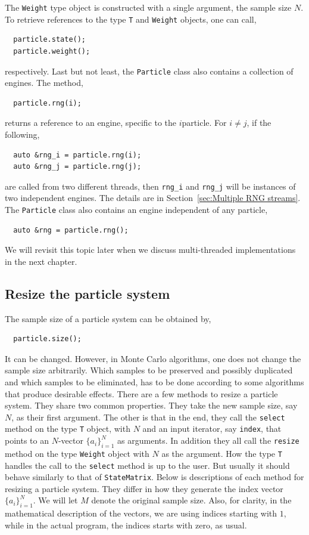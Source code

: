 The \verb|Weight| type object is constructed with a single argument, the sample
size $N$. To retrieve references to the type \verb|T| and \verb|Weight|
objects, one can call,
\begin{Verbatim}
  particle.state();
  particle.weight();
\end{Verbatim}
respectively. Last but not least, the \verb|Particle| class also contains a
collection of \rng engines. The method,
\begin{Verbatim}
  particle.rng(i);
\end{Verbatim}
returns a reference to an \rng engine, specific to the $i$\ith particle. For $i
\ne j$, if the following,
\begin{Verbatim}
  auto &rng_i = particle.rng(i);
  auto &rng_j = particle.rng(j);
\end{Verbatim}
are called from two different threads, then \verb|rng_i| and \verb|rng_j| will
be instances of two independent \rng engines. The details are in
Section~\ref{sec:Multiple RNG streams}. The \verb|Particle| class also contains
an \rng engine independent of any particle,
\begin{Verbatim}
  auto &rng = particle.rng();
\end{Verbatim}
We will revisit this topic later when we discuss multi-threaded implementations
in the next chapter.

\subsection{Resize the particle system}
\label{sub:Resize the particle system}

The sample size of a particle system can be obtained by,
\begin{Verbatim}
  particle.size();
\end{Verbatim}
It can be changed. However, in Monte Carlo algorithms, one does not change the
sample size arbitrarily. Which samples to be preserved and possibly duplicated
and which samples to be eliminated, has to be done according to some algorithms
that produce desirable effects. There are a few methods to resize a particle
system. They share two common properties. They take the new sample size, say
$N$, as their first argument. The other is that in the end, they call the
\verb|select| method on the type \verb|T| object, with $N$ and an input
iterator, say \verb|index|, that points to an $N$-vector $\{a_i\}_{i=1}^N$ as
arguments. In addition they all call the \verb|resize| method on the type
\verb|Weight| object with $N$ as the argument. How the type \verb|T| handles
the call to the \verb|select| method is up to the user. But usually it should
behave similarly to that of \verb|StateMatrix|. Below is descriptions of each
method for resizing a particle system. They differ in how they generate the
index vector $\{a_i\}_{i=1}^N$. We will let $M$ denote the original sample
size. Also, for clarity, in the mathematical description of the vectors, we are
using indices starting with $1$, while in the actual \cpp program, the indices
starts with zero, as usual.

